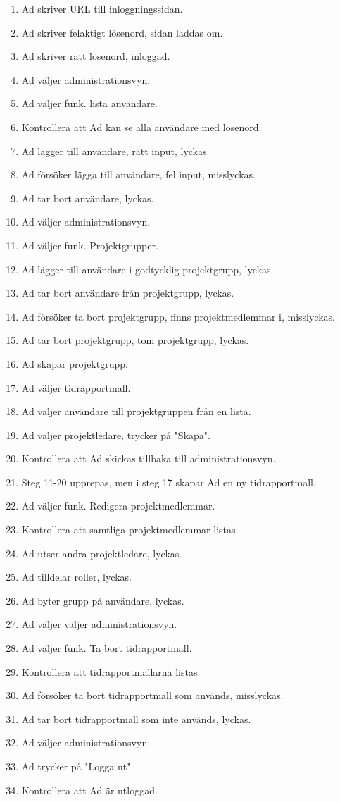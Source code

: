 \documentclass[a4paper]{article}
\begin{document}
\begin{FT}
\begin{enumerate}
\item Ad skriver URL till inloggningssidan.
\item Ad skriver felaktigt lösenord, sidan laddas om.
\item Ad skriver rätt lösenord, inloggad.
\item Ad väljer administrationsvyn.
\item Ad väljer funk. lista användare.
\item Kontrollera att Ad kan se alla användare med lösenord.
\item Ad lägger till användare, rätt input, lyckas.
\item Ad försöker lägga till användare, fel input, misslyckas.
\item Ad tar bort användare, lyckas.
\item Ad väljer administrationsvyn.
\item Ad väljer funk. Projektgrupper.
\item Ad lägger till användare i godtycklig projektgrupp, lyckas.
\item Ad tar bort användare från projektgrupp, lyckas.
\item Ad försöker ta bort projektgrupp, finns projektmedlemmar i, misslyckas.
\item Ad tar bort projektgrupp, tom projektgrupp, lyckas.
\item Ad skapar projektgrupp.
\item Ad väljer tidrapportmall.
\item Ad väljer användare till projektgruppen från en lista.
\item Ad väljer projektledare, trycker på "Skapa".
\item Kontrollera att Ad skickas tillbaka till administrationsvyn.
\item Steg 11-20 upprepas, men i steg 17 skapar Ad en ny tidrapportmall.
\item Ad väljer funk. Redigera projektmedlemmar.
\item Kontrollera att samtliga projektmedlemmar listas.
\item Ad utser andra projektledare, lyckas.
\item Ad tilldelar roller, lyckas.
\item Ad byter grupp på användare, lyckas.
\item Ad väljer väljer administrationsvyn.
\item Ad väljer funk. Ta bort tidrapportmall.
\item Kontrollera att tidrapportmallarna listas.
\item Ad försöker ta bort tidrapportmall som används, misslyckas.
\item Ad tar bort tidrapportmall som inte används, lyckas.
\item Ad väljer administrationsvyn.
\item Ad trycker på "Logga ut".
\item Kontrollera att Ad är utloggad.


\end{enumerate}
\end{FT}
\end{document}
